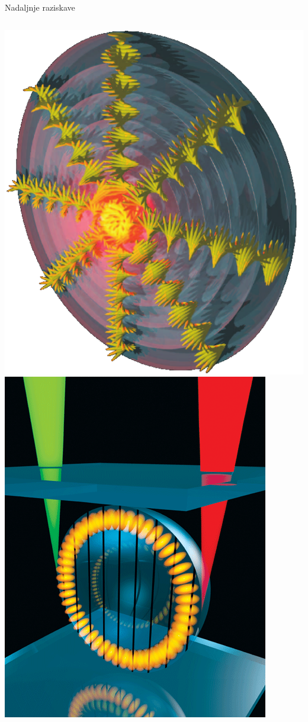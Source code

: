 \documentclass{beamer}
\begin{document}
\begin{frame}{Nadaljnje raziskave}
\begin{columns}
\includegraphics[width=\textwidth]{./Slike/holesterik-resonator} \\[3mm]
\includegraphics[width=\textwidth]{./Slike/largecover}
 
\end{columns}
\end{frame}
\end{document}
